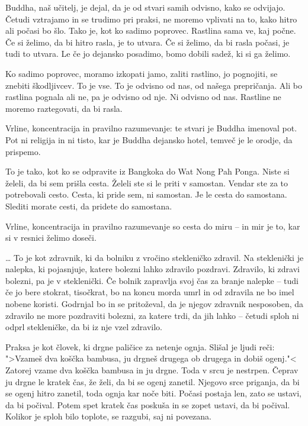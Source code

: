 \vspace{-2\baselineskip}

Buddha, naš učitelj, je dejal, da je od stvari samih odvisno, kako se odvijajo. Četudi vztrajamo in se trudimo pri praksi, ne moremo vplivati na to, kako hitro ali počasi bo šlo. Tako je, kot ko sadimo poprovec. Rastlina sama ve, kaj počne. Če si želimo, da bi hitro rasla, je to utvara. Če si želimo, da bi rasla počasi, je tudi to utvara. Le če jo dejansko posadimo, bomo dobili sadež, ki si ga želimo.

Ko sadimo poprovec, moramo izkopati jamo, zaliti rastlino, jo pognojiti, se znebiti škodljivcev. To je vse. To je odvisno od nas, od našega prepričanja. Ali bo rastlina pognala ali ne, pa je odvisno od nje. Ni odvisno od nas. Rastline ne moremo raztegovati, da bi rasla.

\clearpage


Vrline, koncentracija in pravilno razumevanje: te stvari je Buddha imenoval pot. Pot ni religija in ni tisto, kar je Buddha dejansko hotel, temveč je le orodje, da prispemo.

To je tako, kot ko se odpravite iz Bangkoka do Wat Nong Pah Ponga. Niste si želeli, da bi sem prišla cesta. Želeli ste si le priti v samostan. Vendar ste za to potrebovali cesto. Cesta, ki pride sem, ni samostan. Je le cesta do samostana. Slediti morate cesti, da pridete do samostana.

Vrline, koncentracija in pravilno razumevanje so cesta do miru – in mir je to, kar si v resnici želimo doseči.

\vspace{-\baselineskip}

\ldots{} To je kot zdravnik, ki da bolniku z vročino stekleničko zdravil. Na steklenički je nalepka, ki pojasnjuje, katere bolezni lahko zdravilo pozdravi. Zdravilo, ki zdravi bolezni, pa je v steklenički. Če bolnik zapravlja svoj čas za branje nalepke – tudi če jo bere stokrat, tisočkrat, bo na koncu morda umrl in od zdravila ne bo imel nobene koristi. Godrnjal bo in se pritoževal, da je njegov zdravnik nesposoben, da zdravilo ne more pozdraviti bolezni, za katere trdi, da jih lahko – četudi sploh ni odprl stekleničke, da bi iz nje vzel zdravilo.

\clearpage


Praksa je kot človek, ki drgne paličice za netenje ognja. Slišal je ljudi reči: ">Vzameš dva koščka bambusa, ju drgneš drugega ob drugega in dobiš ogenj."< Zatorej vzame dva koščka bambusa in ju drgne. Toda v srcu je nestrpen. Čeprav ju drgne le kratek čas, že želi, da bi se ogenj zanetil. Njegovo srce priganja, da bi se ogenj hitro zanetil, toda ognja kar noče biti. Počasi postaja len, zato se ustavi, da bi počival. Potem spet kratek čas poskuša in se zopet ustavi, da bi počival. Kolikor je sploh bilo toplote, se razgubi, saj ni povezana.

